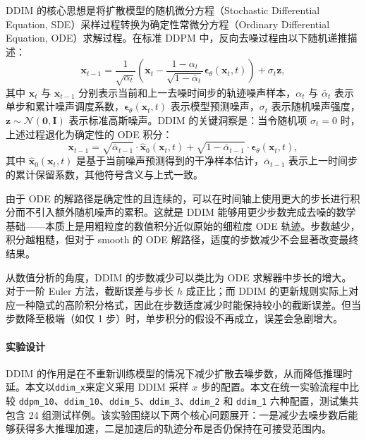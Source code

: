 DDIM 的核心思想是将扩散模型的随机微分方程（Stochastic Differential Equation, SDE）采样过程转换为确定性常微分方程（Ordinary Differential Equation, ODE）求解过程\cite{ddim2020}。在标准 DDPM 中，反向去噪过程由以下随机递推描述：
\begin{equation}
\mathbf{x}_{t-1} = \frac{1}{\sqrt{\alpha_t}} \left(\mathbf{x}_t - \frac{1-\alpha_t}{\sqrt{1-\bar{\alpha}_t}} \boldsymbol{\epsilon}_\theta(\mathbf{x}_t, t)\right) + \sigma_t \mathbf{z},
\end{equation}
其中 $\mathbf{x}_t$ 与 $\mathbf{x}_{t-1}$ 分别表示当前和上一去噪时间步的轨迹噪声样本，$\alpha_t$ 与 $\bar{\alpha}_t$ 表示单步和累计噪声调度系数，$\boldsymbol{\epsilon}_\theta(\mathbf{x}_t,t)$ 表示模型预测噪声，$\sigma_t$ 表示随机噪声强度，$\mathbf{z} \sim \mathcal{N}(\mathbf{0}, \mathbf{I})$ 表示标准高斯噪声。DDIM 的关键洞察是：当令随机项 $\sigma_t = 0$ 时，上述过程退化为确定性的 ODE 积分：
\begin{equation}
\mathbf{x}_{t-1} = \sqrt{\bar{\alpha}_{t-1}} \cdot \hat{\mathbf{x}}_0(\mathbf{x}_t, t) + \sqrt{1-\bar{\alpha}_{t-1}} \cdot \boldsymbol{\epsilon}_\theta(\mathbf{x}_t, t),
\end{equation}
其中 $\hat{\mathbf{x}}_0(\mathbf{x}_t,t)$ 是基于当前噪声预测得到的干净样本估计，$\bar{\alpha}_{t-1}$ 表示上一时间步的累计保留系数，其他符号含义与上式一致。

由于 ODE 的解路径是确定性的且连续的，可以在时间轴上使用更大的步长进行积分而不引入额外随机噪声的累积。这就是 DDIM 能够用更少步数完成去噪的数学基础——本质上是用粗粒度的数值积分近似原始的细粒度 ODE 轨迹。步数越少，积分越粗糙，但对于 smooth 的 ODE 解路径，适度的步数减少不会显著改变最终结果。

从数值分析的角度，DDIM 的步数减少可以类比为 ODE 求解器中步长的增大。对于一阶 Euler 方法，截断误差与步长 $h$ 成正比；而 DDIM 的更新规则实际上对应一种隐式的高阶积分格式，因此在步数适度减少时能保持较小的截断误差。但当步数降至极端（如仅 1 步）时，单步积分的假设不再成立，误差会急剧增大。

\paragraph*{实验设计}

DDIM 的作用是在不重新训练模型的情况下减少扩散去噪步数，从而降低推理时延\cite{ddim2020}。本文以\texttt{ddim\_x}来定义采用 DDIM 采样 $x$ 步的配置。本文在统一实验流程中比较 \texttt{ddpm\_10}、\texttt{ddim\_10}、\texttt{ddim\_5}、\texttt{ddim\_3}、\texttt{ddim\_2} 和 \texttt{ddim\_1} 六种配置，测试集共包含 24 组测试样例。该实验围绕以下两个核心问题展开：一是减少去噪步数后能够获得多大推理加速，二是加速后的轨迹分布是否仍保持在可接受范围内。


